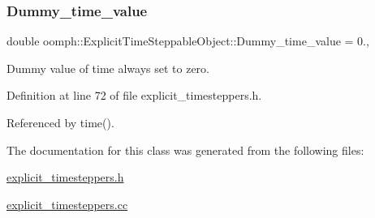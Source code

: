 \subsubsection{\texorpdfstring{Dummy\+\_\+time\+\_\+value}{Dummy\_time\_value}}
{\footnotesize\ttfamily double oomph\+::\+Explicit\+Time\+Steppable\+Object\+::\+Dummy\+\_\+time\+\_\+value = 0.\hspace{0.3cm}{\ttfamily [static]}, {\ttfamily [private]}}



Dummy value of time always set to zero. 



Definition at line 72 of file explicit\+\_\+timesteppers.\+h.



Referenced by time().



The documentation for this class was generated from the following files\+:\begin{DoxyCompactItemize}
\item 
\hyperlink{explicit__timesteppers_8h}{explicit\+\_\+timesteppers.\+h}\item 
\hyperlink{explicit__timesteppers_8cc}{explicit\+\_\+timesteppers.\+cc}\end{DoxyCompactItemize}
